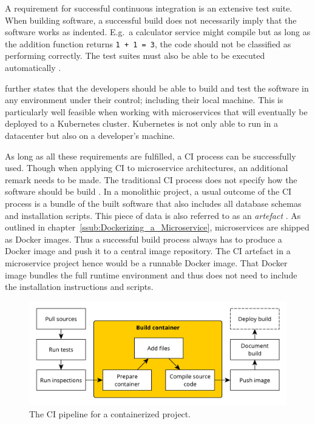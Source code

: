 A requirement for successful continuous integration is an extensive test suite.
When building software, a successful build does not necessarily imply that the
software works as indented. E.g.\ a calculator service might compile but as
long as the addition function returns \texttt{1 + 1 = 3}, the code should not be
classified as performing correctly. The test suites must also be able to be
executed automatically \autocite[p. 60]{JezHumbleContinuousDelivery2010}.

\autocite[p. 62]{JezHumbleContinuousDelivery2010} further states that the
developers should be able to build and test the software in any environment
under their control; including their local machine. This is particularly well
feasible when working with microservices that will eventually be deployed to a
Kubernetes cluster. Kubernetes is not only able to run in a datacenter but also
on a developer's machine.

As long as all these requirements are fulfilled, a \ac{CI} process can be
successfully used. Though when applying \ac{CI} to microservice architectures,
an additional remark needs to be made. The traditional \ac{CI} process does
not specify how the software should be build \autocite[p.
18]{MatyasContinuousIntegration2007}. In a monolithic project, a usual outcome
of the \ac{CI} process is a bundle of the built software that also includes all
database schemas and installation scripts. This piece of data is also referred
to as an \textit{artefact} \autocite[p. 18]{MatyasContinuousIntegration2007}.
As outlined in chapter~\ref{ssub:Dockerizing_a_Microservice}, microservices are
shipped as Docker images. Thus a successful build process always has to produce
a Docker image and push it to a central image repository. The \ac{CI} artefact
in a microservice project hence would be a runnable Docker image. That Docker
image bundles the full runtime environment and thus does not need to include
the installation instructions and scripts.

\begin{figure}[H]
\begin{center}
  \includegraphics[scale=0.7]{images/figures/ci_container.pdf}
\end{center}
\caption{The \ac{CI} pipeline for a containerized project.}%
\label{fig:container_ci_pipeline}
\end{figure}

